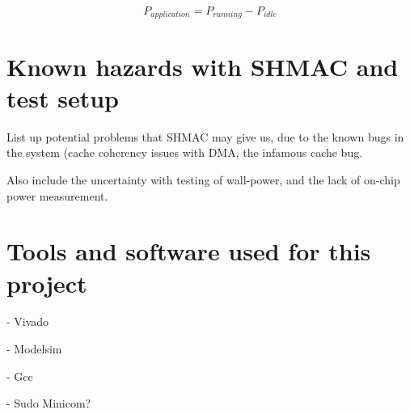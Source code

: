 \[P_{application} = P_{running} - P_{idle}\]




%
%
\section{Known hazards with SHMAC and test setup}
List up potential problems that SHMAC may give us, due to the known bugs in the system (cache coherency issues with DMA, the infamous cache bug.

Also include the uncertainty with testing of wall-power, and the lack of on-chip power measurement.

\section{Tools and software used for this project}
- Vivado

- Modelsim

- Gcc

- Sudo Minicom?
